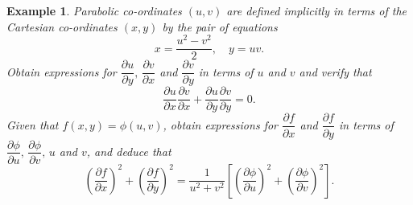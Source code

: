 \documentclass[titlepage,a4paper,12pt]{report}
\newtheorem{example}{Example}[section]
\begin{document}
\begin{example}
Parabolic co-ordinates $(u,v)$ are defined implicitly in terms of the Cartesian co-ordinates $(x,y)$ by the pair of equations 
\[x=\dfrac{u^2-v^2}{2}, \quad y=uv.\]
Obtain expressions for $\dfrac{\partial u}{\partial y}, \, \dfrac{\partial v}{\partial x}$ and $\dfrac{\partial v}{\partial y}$ in terms of $u$ and $v$ and verify that 
\[\dfrac{\partial u}{\partial x}\dfrac{\partial v}{\partial x}+\dfrac{\partial u}{\partial y}\dfrac{\partial v}{\partial y}=0.\] Given that $f(x,y)=\phi (u,v)$, obtain expressions for $\dfrac{\partial f}{\partial x}$ and $\dfrac{\partial f}{\partial y}$ in terms of $\dfrac{\partial \phi}{\partial u}, \, \dfrac{\partial \phi}{\partial v}, \, u$ and $v$, and deduce that 
\[\left(\dfrac{\partial f}{\partial x}\right)^2 +\left(\dfrac{\partial f}{\partial y}\right)^2=\dfrac{1}{u^2+v^2}\left[\left(\dfrac{\partial \phi}{\partial u}\right)^2+\left(\dfrac{\partial \phi}{\partial v}\right)^2\right].\]


\end{example}
\end{document}
